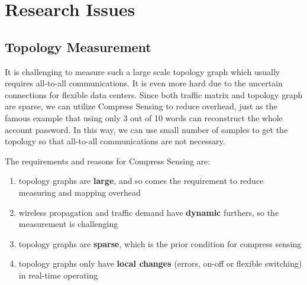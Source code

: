 \documentclass[journal,onecolumn,11pt]{IEEEtran}
\begin{document}

\section{Research Issues}


\subsection{Topology Measurement}

It is challenging to measure such a large scale topology graph which usually requires all-to-all communications. It is even more hard due to the uncertain connections for flexible data centers. Since both traffic matrix \cite{Greenberg:2009:VSF:1592568.1592576,Halperin:2011:ADC:2018436.2018442} and topology graph \cite{Chen:2010:GAA:1851182.1851190} are sparse, we can utilize Compress Sensing to reduce overhead, just as the famous example that using only 3 out of 10 words can reconstruct the whole account password. In this way, we can use small number of samples to get the topology so that all-to-all communications are not necessary.

The requirements and reasons for Compress Sensing are:
\begin{enumerate}
  \item topology graphs are \textbf{large}, and so comes the requirement to reduce measuring and mapping overhead
  \item wireless propagation and traffic demand have \textbf{dynamic} furthers, so the measurement is challenging
  \item topology graphs are \textbf{sparse}, which is the prior condition for compress sensing
  \item topology graphs only have \textbf{local changes} (errors, on-off or flexible switching) in real-time operating
\end{enumerate}
\end{document}
